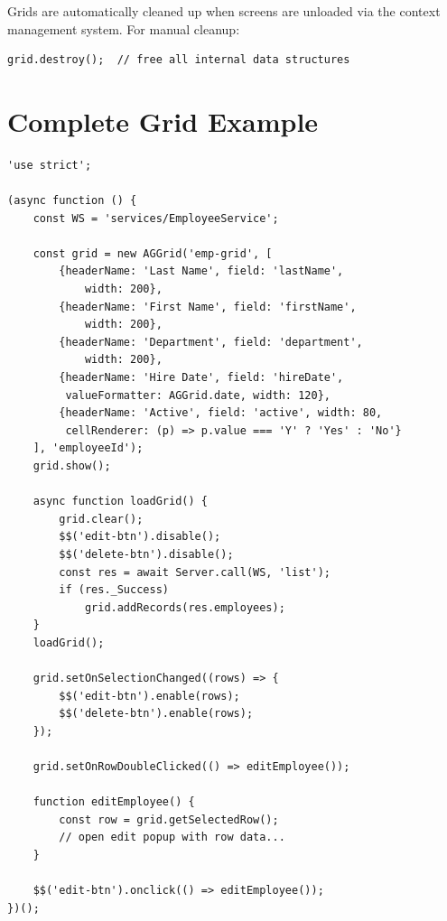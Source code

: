 Grids are automatically cleaned up when screens are unloaded via the context management system.  For manual cleanup:

\begin{lstlisting}[style=javascript]
grid.destroy();  // free all internal data structures
\end{lstlisting}

\section{Complete Grid Example}
\label{sec:grid-example}

\begin{lstlisting}[style=javascript]
'use strict';

(async function () {
    const WS = 'services/EmployeeService';

    const grid = new AGGrid('emp-grid', [
        {headerName: 'Last Name', field: 'lastName',
            width: 200},
        {headerName: 'First Name', field: 'firstName',
            width: 200},
        {headerName: 'Department', field: 'department',
            width: 200},
        {headerName: 'Hire Date', field: 'hireDate',
         valueFormatter: AGGrid.date, width: 120},
        {headerName: 'Active', field: 'active', width: 80,
         cellRenderer: (p) => p.value === 'Y' ? 'Yes' : 'No'}
    ], 'employeeId');
    grid.show();

    async function loadGrid() {
        grid.clear();
        $$('edit-btn').disable();
        $$('delete-btn').disable();
        const res = await Server.call(WS, 'list');
        if (res._Success)
            grid.addRecords(res.employees);
    }
    loadGrid();

    grid.setOnSelectionChanged((rows) => {
        $$('edit-btn').enable(rows);
        $$('delete-btn').enable(rows);
    });

    grid.setOnRowDoubleClicked(() => editEmployee());

    function editEmployee() {
        const row = grid.getSelectedRow();
        // open edit popup with row data...
    }

    $$('edit-btn').onclick(() => editEmployee());
})();
\end{lstlisting}
